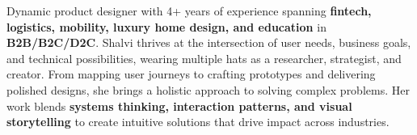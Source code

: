 \documentclass[10pt,a4paper,ragged2e,withhyper]{altacv}
\begin{document}


\makecvheader

Dynamic product designer with 4+ years of experience spanning \textbf{fintech, logistics, mobility, luxury home design, and education} in \textbf{B2B/B2C/D2C}. Shalvi thrives at the intersection of user needs, business goals, and technical possibilities, wearing multiple hats as a researcher, strategist, and creator. From mapping user journeys to crafting prototypes and delivering polished designs, she brings a holistic approach to solving complex problems. 
Her work blends \textbf{systems thinking, interaction patterns, and visual storytelling} to create intuitive solutions that drive impact across industries.

\end{document}
